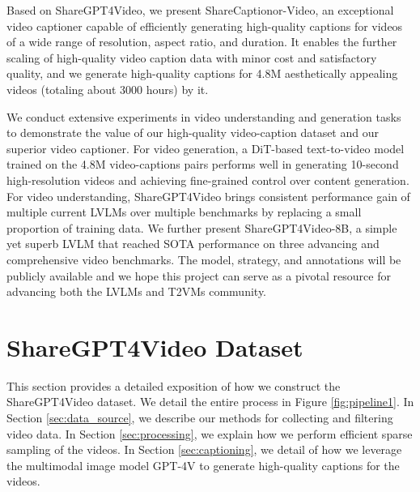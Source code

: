 Based on ShareGPT4Video, we present ShareCaptionor-Video, an exceptional video captioner capable of efficiently generating high-quality captions for videos of a wide range of resolution, aspect ratio, and duration. It enables the further scaling of high-quality video caption data with minor cost and satisfactory quality, and we generate high-quality captions for 4.8M aesthetically appealing videos (totaling about 3000 hours) by it. 
 

We conduct extensive experiments in video understanding and generation tasks to demonstrate the value of our high-quality video-caption dataset and our superior video captioner. 
For video generation, a DiT-based \cite{peebles2023scalable} text-to-video model trained on the 4.8M video-captions pairs performs well in generating 10-second high-resolution videos and achieving fine-grained control over content generation.
For video understanding, ShareGPT4Video brings consistent performance gain of multiple current LVLMs over multiple benchmarks by replacing a small proportion of training data. We further present ShareGPT4Video-8B, a simple yet superb LVLM that reached SOTA performance on three advancing and comprehensive video benchmarks. The model, strategy, and annotations will be publicly available and we hope this project can serve as a pivotal resource for advancing both the LVLMs and T2VMs community.

\section{ShareGPT4Video Dataset}
This section provides a detailed exposition of how we construct the ShareGPT4Video dataset. We detail the entire process in Figure \ref{fig:pipeline1}. In Section \ref{sec:data_source}, we describe our methods for collecting and filtering video data. In Section \ref{sec:processing}, we explain how we perform efficient sparse sampling of the videos. In Section \ref{sec:captioning}, we detail of how we leverage the multimodal image model GPT-4V to generate high-quality captions for the videos.


